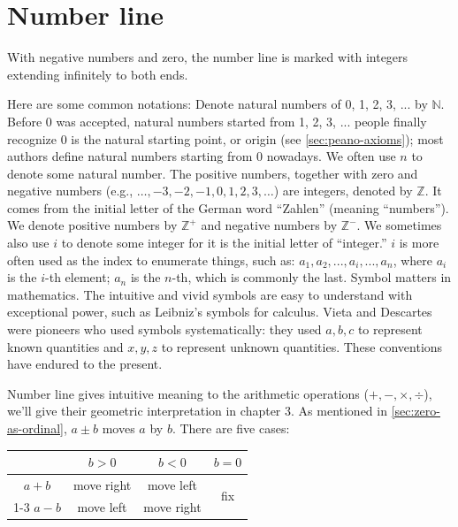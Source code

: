 \documentclass[b5paper]{article}
\begin{document}
\section{Number line}
With negative numbers and zero, the number line is marked with integers extending infinitely to both ends.

\begin{center}
\end{center}

Here are some common notations: Denote natural numbers of 0, 1, 2, 3, ... by $\mathbb{N}$. Before 0 was accepted, natural numbers started from 1, 2, 3, ... people finally recognize 0 is the natural starting point, or origin (see \cref{sec:peano-axioms}); most authors define natural numbers starting from 0 nowadays. We often use $n$ to denote some natural number. The positive numbers, together with zero and negative numbers (e.g., $\dotsc, -3, -2, -1, 0, 1, 2, 3, \dotsc$) are integers, denoted by $\mathbb{Z}$. It comes from the initial letter of the German word \enquote{Zahlen} (meaning \enquote{numbers}). We denote positive numbers by $\mathbb{Z}^+$ and negative numbers by $\mathbb{Z}^-$. We sometimes also use $i$ to denote some integer for it is the initial letter of \enquote{integer.} $i$ is more often used as the index to enumerate things, such as: $a_1, a_2, ..., a_i, ..., a_n$, where $a_i$ is the $i$-th element; $a_n$ is the $n$-th, which is commonly the last. Symbol matters in mathematics. The intuitive and vivid symbols are easy to understand with exceptional power, such as Leibniz's symbols for calculus. Vieta and Descartes were pioneers who used symbols systematically: they used $a, b, c$ to represent known quantities and $x, y, z$ to represent unknown quantities. These conventions have endured to the present.

Number line gives intuitive meaning to the arithmetic operations ($+, -, \times, \div$), we'll give their geometric interpretation in chapter 3. As mentioned in \cref{sec:zero-as-ordinal}, $a \pm b$ moves $a$ by $b$. There are five cases:

\begin{center}
  \begin{tabular}{c|c|c|c}
          & $b > 0$ & $b < 0$ & $b = 0$ \\
  \hline
  $a + b$ & move right     & move left    & \multirow{2}{*}{fix} \\
  \cline{1-3}
  $a - b$ & move left     & move right
  \end{tabular}
\end{center}
\end{document}
